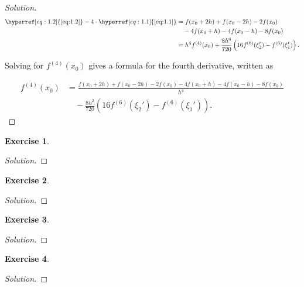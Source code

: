 \documentclass[12pt,a4]{article}
\theoremstyle{definition}
\newtheorem{exercise}{Exercise}
\begin{document}
\begin{proof}[Solution]
	\begin{align*}
	\hyperref[eq:1.2]{\eqref{eq:1.2}} - 4 \cdot \hyperref[eq:1.1]{\eqref{eq:1.1}} &= f(x_0 + 2 h) + f(x_0 - 2 h) - 2 f(x_0)  \\ 
	 &\quad - 4 f(x_0 + h) - 4 f(x_0 - h) - 8 f(x_0) \\
	 &= h^4 f^{(4)}(x_0) + \frac{8 h^6}{720} \left( 16 f^{(6)}(\xi_2') - f^{(6)}(\xi_1') \right) {.}
	\end{align*}
	
	\noindent Solving for $f^{(4)}(x_0)$ gives a formula for the fourth derivative, written as 
	
	\begin{align*}
	f^{(4)}(x_0) &= \frac{f(x_0 + 2 h) + f(x_0 - 2 h) - 2 f(x_0) - 4 f(x_0 + h) - 4 f(x_0 - h) - 8 f(x_0)}{h^4} \\
	 &\quad - \frac{8 h^2}{720} \left( 16 f^{(6)}(\xi_2') - f^{(6)}(\xi_1') \right) {.} 
	\end{align*}
\end{proof}

\begin{exercise}
	
\end{exercise}
\begin{proof}[Solution]
	
\end{proof}

\begin{exercise}
	
\end{exercise}
\begin{proof}[Solution]
	
\end{proof}

\begin{exercise}
	
\end{exercise}
\begin{proof}[Solution]
	
\end{proof}

\begin{exercise}
	
\end{exercise}
\begin{proof}[Solution]
	
\end{proof}
\end{document}
